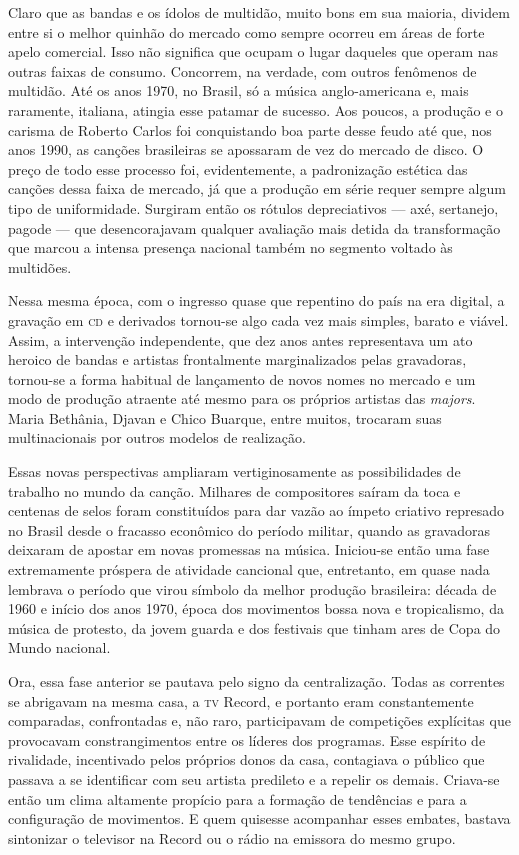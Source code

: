 Claro que as bandas e os ídolos de multidão, muito bons em sua maioria,
dividem entre si o melhor quinhão do mercado como sempre ocorreu em
áreas de forte apelo comercial. Isso não significa que ocupam o lugar
daqueles que operam nas outras faixas de consumo. Concorrem, na verdade,
com outros fenômenos de multidão. Até os anos 1970, no Brasil, só a
música anglo-americana e, mais raramente, italiana, atingia esse
patamar de sucesso. Aos poucos, a produção e o carisma de Roberto Carlos
foi conquistando boa parte desse feudo até que, nos anos 1990, as
canções brasileiras se apossaram de vez do mercado de disco. O preço de
todo esse processo foi, evidentemente, a padronização estética das
canções dessa faixa de mercado, já que a produção em série requer sempre
algum tipo de uniformidade. Surgiram então os rótulos depreciativos ---
axé, sertanejo, pagode --- que desencorajavam qualquer avaliação mais
detida da transformação que marcou a intensa presença nacional também no
segmento voltado às multidões.

Nessa mesma época, com o ingresso quase que repentino do país na era
digital, a gravação em \textsc{cd} e derivados tornou-se algo cada vez mais
simples, barato e viável. Assim, a intervenção independente, que dez
anos antes representava um ato heroico de bandas e artistas frontalmente
marginalizados pelas gravadoras, tornou-se a forma habitual de
lançamento de novos nomes no mercado e um modo de produção atraente até
mesmo para os próprios artistas das \emph{majors}. Maria Bethânia,
Djavan e Chico Buarque, entre muitos, trocaram suas multinacionais por
outros modelos de realização.

Essas novas perspectivas ampliaram vertiginosamente as possibilidades de
trabalho no mundo da canção. Milhares de compositores saíram da toca e
centenas de selos foram constituídos para dar vazão ao ímpeto criativo
represado no Brasil desde o fracasso econômico do período militar,
quando as gravadoras deixaram de apostar em novas promessas na música.
Iniciou-se então uma fase extremamente próspera de atividade cancional
que, entretanto, em quase nada lembrava o período que virou símbolo da
melhor produção brasileira: década de 1960 e início dos anos 1970, época
dos movimentos bossa nova e tropicalismo, da música de protesto, da
jovem guarda e dos festivais que tinham ares de Copa do Mundo
nacional.

Ora, essa fase anterior se pautava pelo signo da centralização. Todas as
correntes se abrigavam na mesma casa, a \textsc{tv} Record, e portanto eram
constantemente comparadas, confrontadas e, não raro, participavam de
competições explícitas que provocavam constrangimentos entre os líderes
dos programas. Esse espírito de rivalidade, incentivado pelos próprios
donos da casa, contagiava o público que passava a se identificar com seu
artista predileto e a repelir os demais. Criava-se então um clima
altamente propício para a formação de tendências e para a configuração
de movimentos. E quem quisesse acompanhar esses embates, bastava
sintonizar o televisor na Record ou o rádio na emissora do mesmo grupo.

